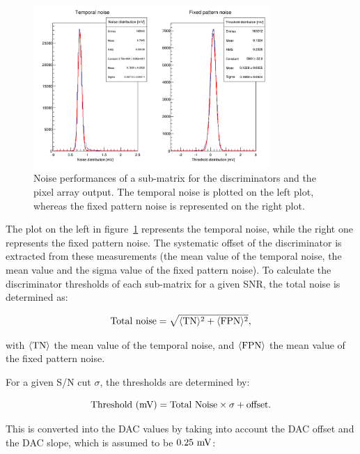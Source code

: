   \begin{figure}[!tbh]
    \centering
    \includegraphics[width=0.8\textwidth]{Pictures/labTests/noise_A.png}
    \caption{Noise performances of a sub-matrix for the discriminators and the pixel array output. The temporal noise is plotted on the left plot, whereas the fixed pattern noise is represented on the right plot.} 
    \label{fig:TN&FPN}
  \end{figure}

  The plot on the left in figure~\ref{fig:TN&FPN} represents the temporal noise, while the right one represents the fixed pattern noise.
  The systematic offset of the discriminator is extracted from these measurements (the mean value of the temporal noise, the mean value and the sigma value of the fixed pattern noise).
  To calculate the discriminator thresholds of each sub-matrix for a given \acrfull{SNR}, the total noise is determined as:
  
  \begin{equation}
    \rm{Total~noise} = \sqrt{\langle\rm{TN}\rangle^2 + \langle\rm{FPN}\rangle^2},
  \end{equation}

  with $\langle\rm{TN}\rangle$ the mean value of the temporal noise, and $\langle\rm{FPN}\rangle$ the mean value of the fixed pattern noise.

  For a given S/N cut $\sigma$, the thresholds are determined by:

  \begin{equation}
    \rm{Threshold~(mV)} = \rm{Total~Noise} \times \sigma + \rm{offset}.
  \end{equation}

  This is converted into the \gls{DAC} values by taking into account the \gls{DAC} offset and the \gls{DAC} slope, which is assumed to be $0.25~\rm{mV}$:
  
